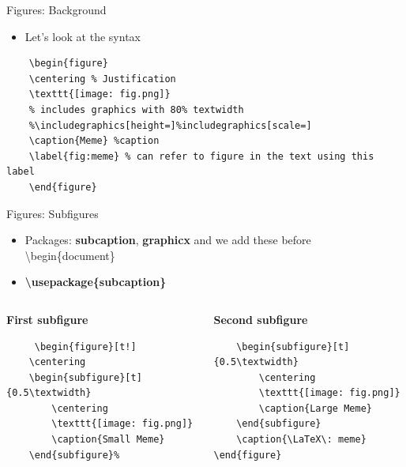 \begin{frame}[fragile]{Figures: Background}
\begin{itemize}
    \item Let's look at the syntax
\end{itemize}
\begin{verbatim}
    \begin{figure} 
    \centering % Justification
    \texttt{[image: fig.png]} 
    % includes graphics with 80% textwidth
    %\includegraphics[height=]%includegraphics[scale=]
    \caption{Meme} %caption
    \label{fig:meme} % can refer to figure in the text using this label
    \end{figure}
\end{verbatim}
\end{frame}

\begin{frame}[fragile]{Figures: Subfigures}
\begin{itemize}
    \item Packages: \textbf{subcaption}, \textbf{graphicx} and we add these before \textbackslash begin\{document\}
    \item \textbf{\textbackslash usepackage\{subcaption\}}
\end{itemize}
\begin{columns}
    \begin{column}{0.5\textwidth}
    \textbf{First subfigure}
        \begin{small}
\begin{verbatim}
     \begin{figure}[t!]
    \centering
    \begin{subfigure}[t]{0.5\textwidth}
        \centering
        \texttt{[image: fig.png]}
        \caption{Small Meme}
    \end{subfigure}%
    \end{verbatim}
    \end{small}
    \end{column}
\begin{column}{0.5\textwidth}
\textbf{Second subfigure}
        \begin{small}
\begin{verbatim}
    \begin{subfigure}[t]{0.5\textwidth}
        \centering
        \texttt{[image: fig.png]}
        \caption{Large Meme}
    \end{subfigure}
    \caption{\LaTeX\: meme}
\end{figure}
\end{verbatim}
\end{small}
\end{column}
\end{columns}
\end{frame}
